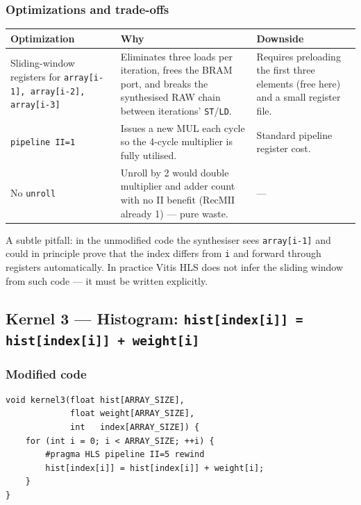\documentclass[11pt,a4paper]{article}
\begin{document}
\subsubsection*{Optimizations and trade-offs}

\begin{center}
\begin{tabular}{p{3.2cm} p{6cm} p{5cm}}
\toprule
Optimization & Why & Downside \\
\midrule
Sliding-window registers for \texttt{array[i-1], array[i-2], array[i-3]} & Eliminates three loads per iteration, frees the BRAM port, and breaks the synthesised RAW chain between iterations' \texttt{ST}/\texttt{LD}. & Requires preloading the first three elements (free here) and a small register file. \\
\addlinespace
\texttt{pipeline II=1} & Issues a new MUL each cycle so the 4-cycle multiplier is fully utilised. & Standard pipeline register cost. \\
\addlinespace
No \texttt{unroll} & Unroll by 2 would double multiplier and adder count with no II benefit (RecMII already 1) --- pure waste. & --- \\
\bottomrule
\end{tabular}
\end{center}

A subtle pitfall: in the unmodified code the synthesiser sees \texttt{array[i-1]} and could in principle prove that the index differs from \texttt{i} and forward through registers automatically. In practice Vitis HLS does not infer the sliding window from such code --- it must be written explicitly.

\subsection{Kernel 3 --- Histogram: \texttt{hist[index[i]] = hist[index[i]] + weight[i]}}

\subsubsection*{Modified code}

\begin{lstlisting}
void kernel3(float hist[ARRAY_SIZE],
             float weight[ARRAY_SIZE],
             int   index[ARRAY_SIZE]) {
    for (int i = 0; i < ARRAY_SIZE; ++i) {
        #pragma HLS pipeline II=5 rewind
        hist[index[i]] = hist[index[i]] + weight[i];
    }
}
\end{lstlisting}
\end{document}
